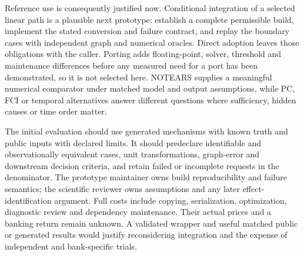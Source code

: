 Reference use is consequently justified now. Conditional integration of a
selected linear path is a plausible next prototype: establish a complete
permissible build, implement the stated conversion and failure contract,
and replay the boundary cases with independent graph and numerical oracles.
Direct adoption leaves those obligations with the caller. Porting adds
floating-point, solver, threshold and maintenance differences before any
measured need for a port has been demonstrated, so it is not selected here.
NOTEARS supplies a meaningful numerical comparator under matched model and
output assumptions, while PC, FCI or temporal alternatives answer different
questions where sufficiency, hidden causes or time order matter.

The initial evaluation should use generated mechanisms with known truth and
public inputs with declared limits. It should predeclare identifiable and
observationally equivalent cases, unit transformations, graph-error and
downstream decision criteria, and retain failed or incomplete requests in
the denominator. The prototype maintainer owns build reproducibility and
failure semantics; the scientific reviewer owns assumptions and any later
effect-identification argument. Full costs include copying, serialization,
optimization, diagnostic review and dependency maintenance. Their actual
prices and a banking return remain unknown. A validated wrapper and useful
matched public or generated results would justify reconsidering integration
and the expense of independent and bank-specific trials.
\citep{exec16_dagma_primary,exec16_dagma_runtime,exec16_dagma_exact}
\label{exec16:dagma-reuse-end}
